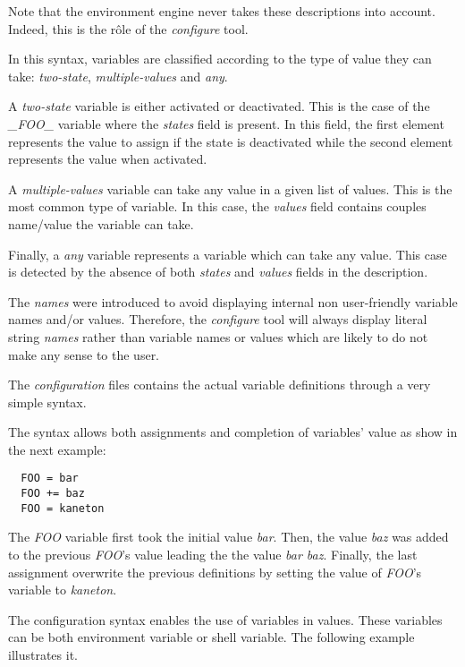 Note that the environment engine never takes these descriptions into account.
Indeed, this is the r\^ole of the \textit{configure} tool.

In this syntax, variables are classified according to the type of value
they can take: \textit{two-state}, \textit{multiple-values} and \textit{any}.

A \textit{two-state} variable is either activated or deactivated. This is
the case of the \textit{\_FOO\_} variable where the \textit{states}
field is present. In this field, the first element represents the value
to assign if the state is deactivated while the second element represents
the value when activated.

A \textit{multiple-values} variable can take any value in a given list of
values. This is the most common type of variable. In this case, the
\textit{values} field contains couples name/value the variable can take.

Finally, a \textit{any} variable represents a variable which can take any
value. This case is detected by the absence of both \textit{states} and
\textit{values} fields in the description.

The \textit{names} were introduced to avoid displaying internal
non user-friendly variable names and/or values. Therefore, the
\textit{configure} tool will always display literal string \textit{names}
rather than variable names or values which are likely to do not make any
sense to the user.



The \textit{configuration} files contains the actual variable definitions
through a very simple syntax.

The syntax allows both assignments and completion of variables' value
as show in the next example:

\begin{verbatim}
  FOO = bar
  FOO += baz
  FOO = kaneton
\end{verbatim}

The \textit{FOO} variable first took the initial value \textit{bar}. Then,
the value \textit{baz} was added to the previous \textit{FOO}'s value
leading the the value \textit{bar baz}. Finally, the last assignment
overwrite the previous definitions by setting the value of \textit{FOO}'s
variable to \textit{kaneton}.

The configuration syntax enables the use of variables in values. These
variables can be both environment variable or shell variable. The following
example illustrates it.

